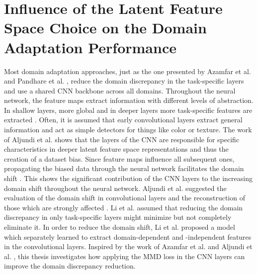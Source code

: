 \section{Influence of the Latent Feature Space Choice on the Domain Adaptation Performance}
Most domain adaptation approaches, just as the one presented by Azamfar et al. \cite{AZAMFAR2020103932} and Pandhare et al. \cite{Pandhare2021}, reduce the domain discrepancy in the task-specific layers and use a shared CNN backbone across all domains. Throughout the neural network, the feature maps extract information with different levels of abstraction. In shallow layers, more global and in deeper layers more task-specific features are extracted \cite{Aljundi2016}. Often, it is assumed that early convolutional layers extract general information and act as simple detectors for things like color or texture. The work of Aljundi et al. \cite{Aljundi2016} shows that the layers of the CNN are responsible for specific characteristics in deeper latent feature space representations and thus the creation of a dataset bias. Since feature maps influence all subsequent ones, propagating the biased data through the neural network facilitates the domain shift \cite{Aljundi2016}. This shows the significant contribution of the CNN layers to the increasing domain shift throughout the neural network. Aljundi et al. \cite{Aljundi2016} suggested the evaluation of the domain shift in convolutional layers and the reconstruction of those which are strongly affected \cite{Aljundi2016}. Li et al. \cite{li2020} assumed that reducing the domain discrepancy in only task-specific layers might minimize but not completely eliminate it. In order to reduce the domain shift, Li et al. \cite{li2020} proposed a model which separately learned to extract domain-dependent and -independent features in the convolutional layers. Inspired by the work of Azamfar et al. \cite{Aljundi2016} and Aljundi et al. \cite{Aljundi2016}, this thesis investigates how applying the MMD loss in the CNN layers can improve the domain discrepancy reduction.

